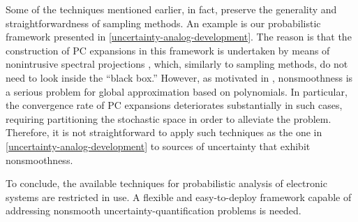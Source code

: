 Some of the techniques mentioned earlier, in fact, preserve the generality and
straightforwardness of sampling methods. An example is our probabilistic
framework presented in \cref{uncertainty-analog-development}. The reason is that
the construction of \ac{PC} expansions in this framework is undertaken by means
of nonintrusive spectral projections \cite{xiu2010}, which, similarly to
sampling methods, do not need to look inside the ``black box.'' However, as
motivated in , nonsmoothness is a serious problem for
global approximation based on polynomials. In particular, the convergence rate
of \ac{PC} expansions deteriorates substantially in such cases, requiring
partitioning the stochastic space in order to alleviate the problem. Therefore,
it is not straightforward to apply such techniques as the one in
\cref{uncertainty-analog-development} to sources of uncertainty that exhibit
nonsmoothness.

To conclude, the available techniques for probabilistic analysis of electronic
systems are restricted in use. A flexible and easy-to-deploy framework capable
of addressing nonsmooth uncertainty-quantification problems is needed.

